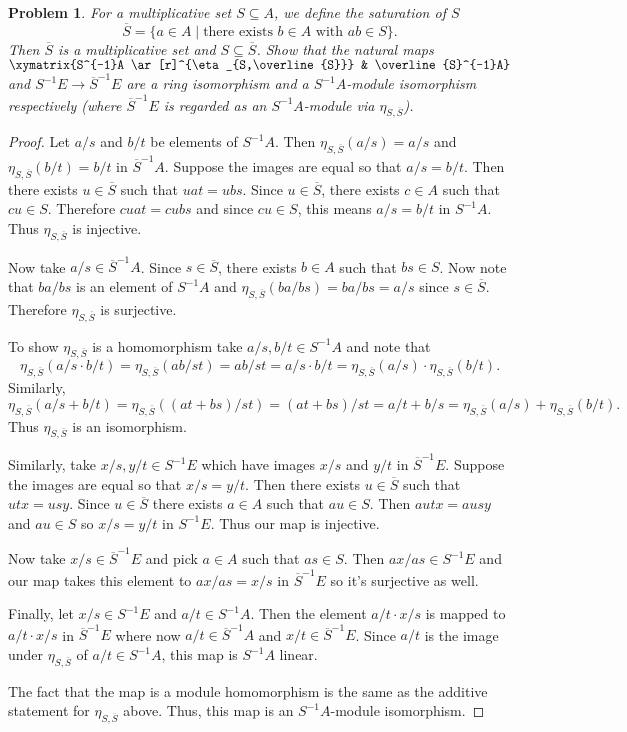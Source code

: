 \documentclass{article}
\newtheorem{problem}{Problem}
\begin{document}
\begin{problem}
For a multiplicative set $S \subseteq A$, we define the saturation of $S$
\[
\overline{S} = \{a \in A \mid \text{there exists $b \in A$ with $ab \in S$}\}.
\]
Then $\overline{S}$ is a multiplicative set and $S \subseteq \overline{S}$. Show that the natural maps $\xymatrix{S^{-1}A \ar[r]^{\eta_{S,\overline{S}}} & \overline{S}^{-1}A}$ and $S^{-1}E \to \overline{S}^{-1}E$ are a ring isomorphism and a $S^{-1}A$-module isomorphism respectively (where $\overline{S}^{-1}E$ is regarded as an $S^{-1}A$-module via $\eta_{S,\overline{S}}$).
\end{problem}
\begin{proof}
Let $a/s$ and $b/t$ be elements of $S^{-1}A$. Then $\eta_{S,\overline{S}}(a/s) = a/s$ and $\eta_{S,\overline{S}}(b/t) = b/t$ in $\overline{S}^{-1}A$. Suppose the images are equal so that $a/s = b/t$. Then there exists $u \in \overline{S}$ such that $uat = ubs$. Since $u \in \overline{S}$, there exists $c \in A$ such that $cu \in S$. Therefore $cuat = cubs$ and since $cu \in S$, this means $a/s = b/t$ in $S^{-1}A$. Thus $\eta_{S, \overline{S}}$ is injective.

Now take $a/s \in \overline{S}^{-1}A$. Since $s \in \overline{S}$, there exists $b \in A$ such that $bs \in S$. Now note that $ba/bs$ is an element of $S^{-1}A$ and $\eta_{S,\overline{S}}(ba/bs) = ba/bs = a/s$ since $s \in \overline{S}$. Therefore $\eta_{S,\overline{S}}$ is surjective.

To show $\eta_{S,\overline{S}}$ is a homomorphism take $a/s, b/t \in S^{-1}A$ and note that
\[
\eta_{S,\overline{S}}(a/s \cdot b/t) = \eta_{S,\overline{S}}(ab/st) = ab/st = a/s \cdot b/t = \eta_{S,\overline{S}}(a/s) \cdot \eta_{S,\overline{S}}(b/t).
\]
Similarly,
\[
\eta_{S,\overline{S}}(a/s + b/t) = \eta_{S,\overline{S}}((at+bs)/st) = (at+bs)/st = a/t + b/s = \eta_{S,\overline{S}}(a/s) + \eta_{S,\overline{S}}(b/t).
\]
Thus $\eta_{S,\overline{S}}$ is an isomorphism.

Similarly, take $x/s, y/t \in S^{-1}E$ which have images $x/s$ and $y/t$ in $\overline{S}^{-1}E$. Suppose the images are equal so that $x/s = y/t$. Then there exists $u \in \overline{S}$ such that $utx = usy$. Since $u \in \overline{S}$ there exists $a \in A$ such that $au \in S$. Then $autx = ausy$ and $au \in S$ so $x/s = y/t$ in $S^{-1}E$. Thus our map is injective.

Now take $x/s \in \overline{S}^{-1}E$ and pick $a \in A$ such that $as \in S$. Then $ax/as \in S^{-1}E$ and our map takes this element to $ax/as = x/s$ in $\overline{S}^{-1}E$ so it's surjective as well.

Finally, let $x/s \in S^{-1}E$ and $a/t \in S^{-1}A$. Then the element $a/t \cdot x/s$ is mapped to $a/t \cdot x/s$ in $\overline{S}^{-1}E$ where now $a/t \in \overline{S}^{-1}A$ and $x/t \in \overline{S}^{-1}E$. Since $a/t$ is the image under $\eta_{S,\overline{S}}$ of $a/t \in S^{-1}A$, this map is $S^{-1}A$ linear.

The fact that the map is a module homomorphism is the same as the additive statement for $\eta_{S,\overline{S}}$ above. Thus, this map is an $S^{-1}A$-module isomorphism.
\end{proof}
\end{document}
